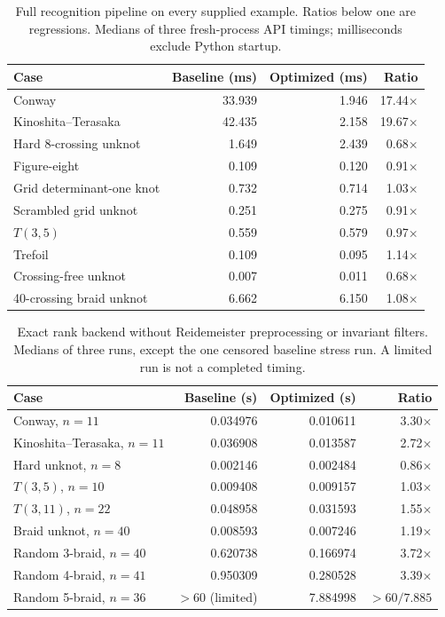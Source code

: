 \begin{table}[H]\centering\small
\begin{tabular}{@{}lrrr@{}}\toprule
Case & Baseline (ms) & Optimized (ms) & Ratio \\\midrule
Conway & 33.939 & 1.946 & 17.44$\times$ \\
Kinoshita--Terasaka & 42.435 & 2.158 & 19.67$\times$ \\
Hard 8-crossing unknot & 1.649 & 2.439 & 0.68$\times$ \\
Figure-eight & 0.109 & 0.120 & 0.91$\times$ \\
Grid determinant-one knot & 0.732 & 0.714 & 1.03$\times$ \\
Scrambled grid unknot & 0.251 & 0.275 & 0.91$\times$ \\
$T(3,5)$ & 0.559 & 0.579 & 0.97$\times$ \\
Trefoil & 0.109 & 0.095 & 1.14$\times$ \\
Crossing-free unknot & 0.007 & 0.011 & 0.68$\times$ \\
40-crossing braid unknot & 6.662 & 6.150 & 1.08$\times$ \\
\bottomrule\end{tabular}
\caption{Full recognition pipeline on every supplied example. Ratios below one are regressions. Medians of three fresh-process API timings; milliseconds exclude Python startup.}\label{tab:pipeline}
\end{table}

\begin{table}[H]\centering\small
\begin{tabular}{@{}lrrr@{}}\toprule
Case & Baseline (s) & Optimized (s) & Ratio \\\midrule
Conway, $n=11$ & 0.034976 & 0.010611 & 3.30$\times$ \\
Kinoshita--Terasaka, $n=11$ & 0.036908 & 0.013587 & 2.72$\times$ \\
Hard unknot, $n=8$ & 0.002146 & 0.002484 & 0.86$\times$ \\
$T(3,5)$, $n=10$ & 0.009408 & 0.009157 & 1.03$\times$ \\
$T(3,11)$, $n=22$ & 0.048958 & 0.031593 & 1.55$\times$ \\
Braid unknot, $n=40$ & 0.008593 & 0.007246 & 1.19$\times$ \\
Random 3-braid, $n=40$ & 0.620738 & 0.166974 & 3.72$\times$ \\
Random 4-braid, $n=41$ & 0.950309 & 0.280528 & 3.39$\times$ \\
Random 5-braid, $n=36$ & $>60$ (limited) & 7.884998 & $>60/7.885$ \\
\bottomrule\end{tabular}
\caption{Exact rank backend without Reidemeister preprocessing or invariant filters. Medians of three runs, except the one censored baseline stress run. A limited run is not a completed timing.}\label{tab:rank}
\end{table}


